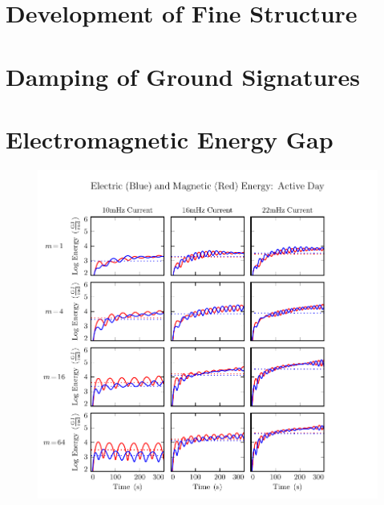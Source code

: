 \section{Development of Fine Structure}

\section{Damping of Ground Signatures}

\section{Electromagnetic Energy Gap}


\begin{figure}[H]
    \centering
    \includegraphics[width=\textwidth]{figures/UB_UE_J_1.pdf}
    \caption[Current-Driven Electric and Magnetic Energy: Active Day]{}
    \label{fig_UB_UE_J_1}
\end{figure}

